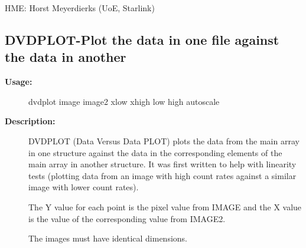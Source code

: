 \begin{description}
\begin{description}
 HME: Horst Meyerdierks (UoE, Starlink)
\end{description}
\subsection{DVDPLOT-\label{DVDPLOT}Plot the data in one file against the data in another}
\begin{description}

\item [\textbf{Usage:}]
 dvdplot image image2 xlow xhigh low high autoscale

\item [\textbf{Description:}]
 DVDPLOT (Data Versus Data PLOT) plots the data from the main
 array in one structure against the data in the corresponding
 elements of the main array in another structure.  It was first
 written to help with linearity tests (plotting data from an
 image with high count rates against a similar image with lower
 count rates).

 The Y value for each point is the pixel value from IMAGE and
 the X value is the value of the corresponding value from
 IMAGE2.

 The images must have identical dimensions.


\end{description}
\end{description}
